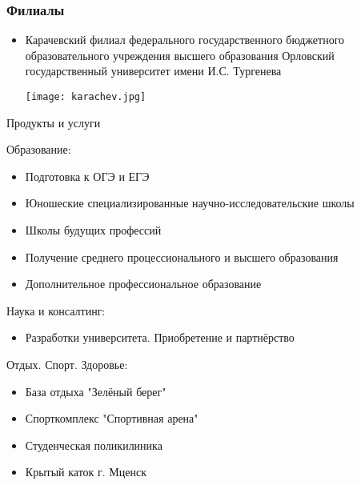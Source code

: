 \documentclass{beamer}
\begin{document}
\begin{frame}
\frametitle{Филиалы}
\begin{itemize}
  \item Карачевский филиал федерального государственного бюджетного образовательного учреждения высшего образования
Орловский государственный университет
имени И.С. Тургенева
  \centering
    \begin{minipage}{0.7\textwidth}
        \centering
  \texttt{[image: karachev.jpg]}
  \end{minipage}
\end{itemize}
\end{frame}

\begin{frame}{Продукты и услуги}

    \alert{Образование:}
    \begin{itemize}
    \item Подготовка к ОГЭ и ЕГЭ
    \item Юношеские специализированные научно-исследовательские школы
    \item Школы будущих профессий
    \item Получение среднего процессионального и высшего образования
    \item Дополнительное профессиональное образование
    \end{itemize}

    \alert{Наука и консалтинг:}
    \begin{itemize}
    \item Разработки университета. Приобретение и партнёрство
    \end{itemize}

    \alert{Отдых. Спорт. Здоровье:}
    \begin{itemize}
    \item База отдыха "Зелёный берег"
    \item Спорткомплекс "Спортивная арена"
    \item Студенческая поликилиника
    \item Крытый каток г. Мценск
    \end{itemize}
    
\end{frame}
\end{document}
